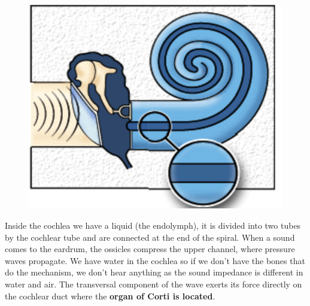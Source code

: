 	\begin{figure}
	\vspace{-5mm}
	\includegraphics[scale=0.25]{acoustics/ch2/2}
	\label{fig:2.2}
	\end{figure}
	Inside the cochlea we have a liquid (the endolymph), it is divided into two tubes by the cochlear tube and are connected at the end of the spiral. When a sound comes to the eardrum, the ossicles compress the upper channel, where pressure waves propagate. We have water in the cochlea so if we don't have the bones that do the mechanism, we don't hear anything as the sound impedance is different in water and air. The transversal component of the wave exerts its force directly on the cochlear duct where the \textbf{organ of Corti is located}. 